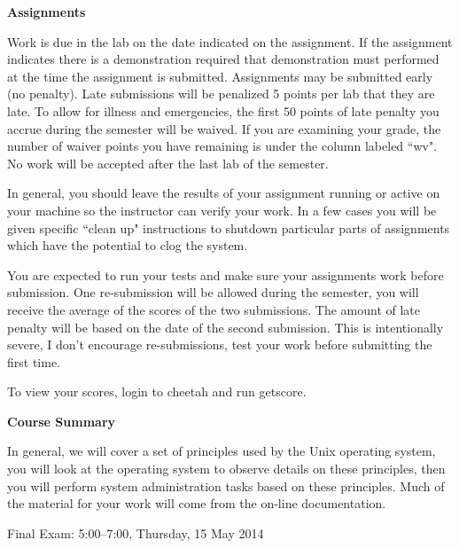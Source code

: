 \vskip 5pt
\centerline{\bf Assignments}

Work is due in the lab on the date indicated on the assignment.
If the assignment indicates there is a demonstration required
that demonstration must performed at the time the assignment is submitted.
Assignments may be submitted early (no penalty).
Late submissions will be penalized 5 points per lab that they are late.
To allow for illness and emergencies,
the first 50 points of late penalty you
accrue during the semester will be waived.
If you are examining your grade, the number of waiver points you have
remaining is under the column labeled ``{\ltt{}wv}".
No work will be accepted after the last lab of the semester.

In general, you should leave the results of your assignment running or
active on your machine so the instructor can verify your work.
In a few cases you will be given specific ``clean up" instructions
to shutdown particular parts of assignments which have the potential
to clog the system.

You are expected to run your tests and make sure your assignments work
before submission.
One re-submission will be allowed during the semester, you will receive
the average of the scores of the two submissions. The amount of late
penalty will be based on the date of the second submission.
This is intentionally severe, I don't encourage re-submissions, test your
work before submitting the first time.

To view your scores, login to {\ltt{}cheetah} and run {\ltt{}getscore}.

\vskip 5pt
\centerline{\bf Course Summary}

In general, we will cover a set of principles used by the Unix operating system,
you will look at the operating system to observe details on these principles,
then you will perform system administration tasks based on these principles.
Much of the material for your work will come from the on-line documentation.

\vskip 5pt
Final Exam: 
5:00--7:00, Thursday, 15 May 2014

\def\week#1{\par\hangindent 0.7in {\indent\llap{\bf #1 \enspace}
\ignorespaces}}

\bye
